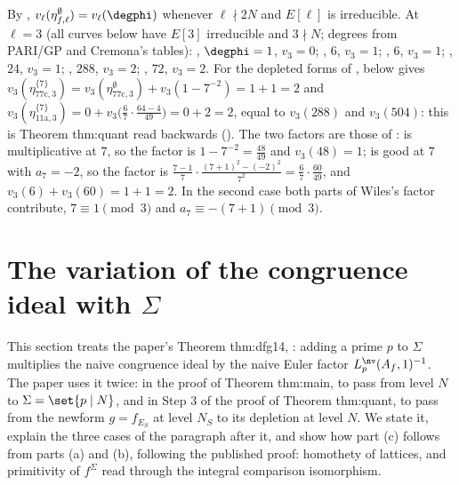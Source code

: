 \begin{example}\label{ex:congruence:eta-values}
By , $v_\ell(\eta^\emptyset_{f,\ell})=v_\ell(\degphi)$ whenever $\ell\nmid2N$ and $E[\ell]$ is irreducible. At $\ell=3$ (all curves below have $E[3]$ irreducible and
$3\nmid N$; degrees from PARI/GP and Cremona's tables): , $\degphi=1$, $v_3=0$; , $6$, $v_3=1$; , $6$, $v_3=1$; , $24$, $v_3=1$; ,
$288$, $v_3=2$; , $72$, $v_3=2$. For the depleted forms of ,  below gives
$v_3(\eta^{\{7\}}_{\text{77c},3})=v_3(\eta^\emptyset_{\text{77c},3})+v_3(1-7^{-2})=1+1=2$ and $v_3(\eta^{\{7\}}_{\text{11a},3})=0+v_3\bigl(\frac67\cdot\frac{64-4}{49}\bigr)=0+2=2$, equal to $v_3(288)$ and $v_3(504)$:
this is Theorem thm:quant read backwards (). The two factors are those of :  is multiplicative at $7$, so the factor is
$1-7^{-2}=\frac{48}{49}$ and $v_3(48)=1$;  is good at $7$ with $a_7=-2$, so the factor is $\frac{7-1}7\cdot\frac{(7+1)^2-(-2)^2}{7^2}=\frac67\cdot\frac{60}{49}$, and $v_3(6)+v_3(60)=1+1=2$. In the second case both
parts of Wiles's factor contribute, $7\equiv1\pmod3$ and $a_7\equiv-(7+1)\pmod3$.
\end{example}

\section{The variation of the congruence ideal with $\Sigma$}\label{sec:congruence:dfg14}

This section treats the paper's Theorem thm:dfg14, \cite[Proposition 1.4(c)]{DFG04}: adding a prime $p$ to $\Sigma$ multiplies the naive congruence ideal by the naive Euler
factor $L^{\nv}_p(A_f,1)^{-1}$. The paper uses it twice: in the proof of Theorem thm:main, to pass from level $N$ to $\Sigma=\set{p\mid N}$, and in Step 3 of the proof of Theorem
thm:quant, to pass from the newform $g=f_{E_S}$ at level $N_S$ to its depletion at level $N$. We state it, explain the three cases of the paragraph after it, and show
how part (c) follows from parts (a) and (b), following the published proof: homothety of lattices, and primitivity of $f^\Sigma$ read through the integral comparison isomorphism.

